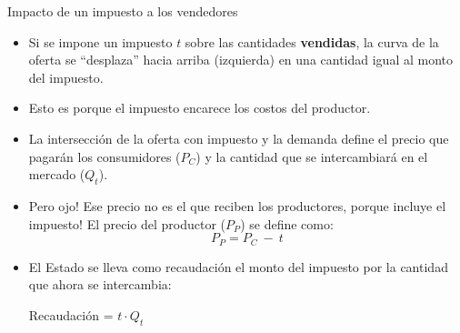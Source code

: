 \documentclass{beamer}
\begin{document}
\begin{frame}{Impacto de un impuesto a los vendedores}
    \begin{itemize}
        \item Si se impone un impuesto $t$ sobre las cantidades \textbf{vendidas}, la curva de la oferta se ``desplaza'' hacia arriba (izquierda) en una cantidad igual al monto del impuesto.
        \item Esto es porque el impuesto encarece los costos del productor. 
        \item La intersección de la oferta con impuesto y la demanda define el precio que pagarán los consumidores ($P_C$) y la cantidad que se intercambiará en el mercado ($Q_t$).
        \item Pero ojo! Ese precio no es el que reciben los productores, porque incluye el impuesto! El precio del productor ($P_P$) se define como:
          \[ P_P=P_C\ - \ t\] 
        \item El Estado se lleva como recaudación el monto del impuesto por la cantidad que ahora se intercambia: \\
        \begin{center}
              Recaudación = $t \cdot Q_t $ 
        \end{center}
    
    \end{itemize}
\end{frame}
    
\end{document}

